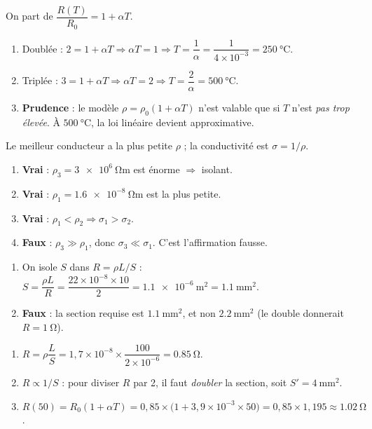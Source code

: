 \documentclass[11pt,a4paper]{article}
\begin{document}
\usetikzlibrary{babel}
\begin{corrige}
On part de $\dfrac{R(T)}{R_0}=1+\alpha T$.
\begin{enumerate}[label=\alph*)]
  \item Doublée : $2=1+\alpha T\Rightarrow \alpha T=1\Rightarrow T=\dfrac{1}{\alpha}=\dfrac{1}{4\times10^{-3}}=\qty{250}{\degreeCelsius}$.
  \item Triplée : $3=1+\alpha T\Rightarrow \alpha T=2\Rightarrow T=\dfrac{2}{\alpha}=\qty{500}{\degreeCelsius}$.
  \item \textbf{Prudence} : le modèle $\rho=\rho_0(1+\alpha T)$ n'est valable que si $T$ n'est
        \emph{pas trop élevée}. À $\qty{500}{\degreeCelsius}$, la loi linéaire devient approximative.
\end{enumerate}
\end{corrige}

\begin{corrige}
Le meilleur conducteur a la plus petite $\rho$ ; la conductivité est $\sigma=1/\rho$.
\begin{enumerate}[label=\alph*)]
  \item \textbf{Vrai} : $\rho_3=\qty{3e6}{\ohm\metre}$ est énorme $\Rightarrow$ isolant.
  \item \textbf{Vrai} : $\rho_1=\qty{1.6e-8}{\ohm\metre}$ est la plus petite.
  \item \textbf{Vrai} : $\rho_1<\rho_2 \Rightarrow \sigma_1>\sigma_2$.
  \item \textbf{Faux} : $\rho_3\gg\rho_1$, donc $\sigma_3\ll\sigma_1$. C'est l'affirmation fausse.
\end{enumerate}
\end{corrige}

\begin{corrige}
\begin{enumerate}[label=\alph*)]
  \item On isole $S$ dans $R=\rho L/S$ : $S=\dfrac{\rho L}{R}=\dfrac{22\times10^{-8}\times10}{2}
        =\qty{1.1e-6}{\metre\squared}=\qty{1.1}{\milli\metre\squared}$.
  \item \textbf{Faux} : la section requise est $\qty{1.1}{\milli\metre\squared}$, et non
        $\qty{2.2}{\milli\metre\squared}$ (le double donnerait $R=\qty{1}{\ohm}$).
\end{enumerate}
\end{corrige}

\begin{corrige}
\begin{enumerate}[label=\alph*)]
  \item $R=\rho\dfrac{L}{S}=1{,}7\times10^{-8}\times\dfrac{100}{2\times10^{-6}}=\qty{0.85}{\ohm}$.
  \item $R\propto1/S$ : pour diviser $R$ par 2, il faut \emph{doubler} la section, soit
        $S'=\qty{4}{\milli\metre\squared}$.
  \item $R(50)=R_0(1+\alpha T)=0{,}85\times\bigl(1+3{,}9\times10^{-3}\times50\bigr)
        =0{,}85\times1{,}195\approx\qty{1.02}{\ohm}$.
\end{enumerate}
\end{corrige}
\end{document}
